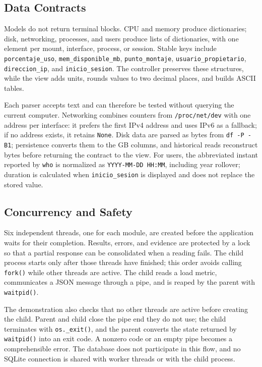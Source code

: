 \documentclass[conference]{IEEEtran}
\begin{document}
\subsection{Data Contracts}
Models do not return terminal blocks. CPU and memory produce dictionaries; disk, networking, processes, and users produce lists of dictionaries, with one element per mount, interface, process, or session. Stable keys include \texttt{porcentaje\_uso}, \texttt{mem\_disponible\_mb}, \texttt{punto\_montaje}, \texttt{usuario\_propietario}, \texttt{direccion\_ip}, and \texttt{inicio\_sesion}. The controller preserves these structures, while the view adds units, rounds values to two decimal places, and builds ASCII tables.

Each parser accepts text and can therefore be tested without querying the current computer. Networking combines counters from \texttt{/proc/net/dev} with one address per interface: it prefers the first IPv4 address and uses IPv6 as a fallback; if no address exists, it retains \texttt{None}. Disk data are parsed as bytes from \texttt{df -P -B1}; persistence converts them to the GB columns, and historical reads reconstruct bytes before returning the contract to the view. For users, the abbreviated instant reported by \texttt{who} is normalized as \texttt{YYYY-MM-DD HH:MM}, including year rollover; duration is calculated when \texttt{inicio\_sesion} is displayed and does not replace the stored value.

\subsection{Concurrency and Safety}
Six independent threads, one for each module, are created before the application waits for their completion. Results, errors, and evidence are protected by a lock so that a partial response can be consolidated when a reading fails. The child process starts only after those threads have finished; this order avoids calling \texttt{fork()} while other threads are active. The child reads a load metric, communicates a JSON message through a pipe, and is reaped by the parent with \texttt{waitpid()}.

The demonstration also checks that no other threads are active before creating the child. Parent and child close the pipe end they do not use; the child terminates with \texttt{os.\_exit()}, and the parent converts the state returned by \texttt{waitpid()} into an exit code. A nonzero code or an empty pipe becomes a comprehensible error. The database does not participate in this flow, and no SQLite connection is shared with worker threads or with the child process.
\end{document}
